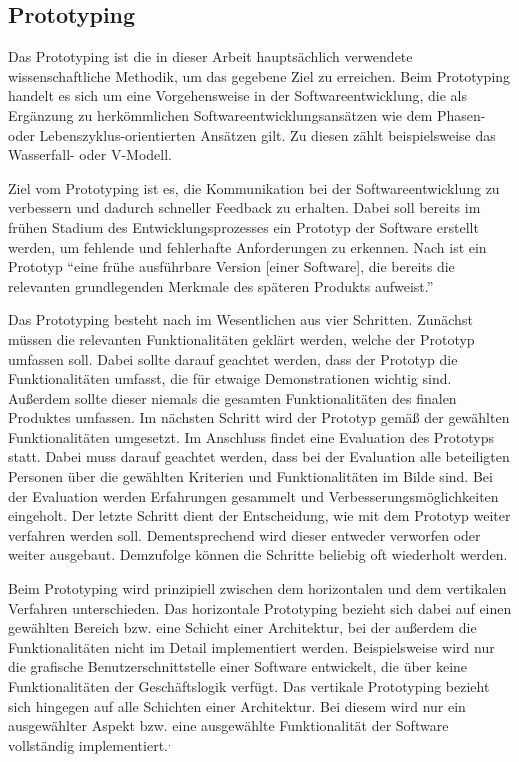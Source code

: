\subsection{Prototyping}

Das Prototyping ist die in dieser Arbeit hauptsächlich verwendete wissenschaftliche Methodik, um das gegebene Ziel zu erreichen.
Beim Prototyping handelt es sich um eine Vorgehensweise in der Softwareentwicklung, die als Ergänzung zu herkömmlichen Softwareentwicklungsansätzen wie dem Phasen- oder Lebenszyklus-orientierten Ansätzen gilt.\autocite[Vgl.][S. 14]{MS-Floyd.1984} 
Zu diesen zählt beispielsweise das Wasserfall- oder V-Modell.

Ziel vom Prototyping ist es, die Kommunikation bei der Softwareentwicklung zu verbessern und dadurch schneller Feedback zu erhalten.\autocite[Vgl.][S. 3]{MS-Floyd.1984} 
Dabei soll bereits im frühen Stadium des Entwicklungsprozesses ein Prototyp der Software erstellt werden, um fehlende und fehlerhafte Anforderungen zu erkennen.\autocite[Vgl.][S. 368]{MS-Alpar.2019}
Nach \citeauthor{MS-Alpar.2019} ist ein Prototyp \enquote{eine frühe ausführbare Version [einer Software], die bereits die relevanten grundlegenden Merkmale des späteren Produkts aufweist.}\autocite[Siehe][S. 369]{MS-Alpar.2019}

Das Prototyping besteht nach \citeauthor{MS-Floyd.1984} im Wesentlichen aus vier Schritten. 
Zunächst müssen die relevanten Funktionalitäten geklärt werden, welche der Prototyp umfassen soll. 
Dabei sollte darauf geachtet werden, dass der Prototyp die Funktionalitäten umfasst, die für etwaige Demonstrationen wichtig sind. 
Außerdem sollte dieser niemals die gesamten Funktionalitäten des finalen Produktes umfassen. 
Im nächsten Schritt wird der Prototyp gemäß der gewählten Funktionalitäten umgesetzt. 
Im Anschluss findet eine Evaluation des Prototyps statt. 
Dabei muss darauf geachtet werden, dass bei der Evaluation alle beteiligten Personen über die gewählten Kriterien und Funktionalitäten im Bilde sind. 
Bei der Evaluation werden Erfahrungen gesammelt und Verbesserungsmöglichkeiten eingeholt. 
Der letzte Schritt dient der Entscheidung, wie mit dem Prototyp weiter verfahren werden soll. 
Dementsprechend wird dieser entweder verworfen oder weiter ausgebaut. 
Demzufolge können die Schritte beliebig oft wiederholt werden.\autocite[Vgl.][S. 4 f.]{MS-Floyd.1984}

Beim Prototyping wird prinzipiell zwischen dem horizontalen und dem vertikalen Verfahren unterschieden. 
Das horizontale Prototyping bezieht sich dabei auf einen gewählten Bereich bzw. eine Schicht einer Architektur, bei der außerdem die Funktionalitäten nicht im Detail implementiert werden. 
Beispielsweise wird nur die grafische Benutzerschnittstelle einer Software entwickelt, die über keine Funktionalitäten der Geschäftslogik verfügt. 
Das vertikale Prototyping bezieht sich hingegen auf alle Schichten einer Architektur. 
Bei diesem wird nur ein ausgewählter Aspekt bzw. eine ausgewählte Funktionalität der Software vollständig implementiert.\autocite[Vgl.][Abschnitt \enquote{Arten von Prototypen}]{MS-Kuhrmann.26.09.2012}$^,$\autocite[Vgl.][S. 4]{MS-Floyd.1984} 

